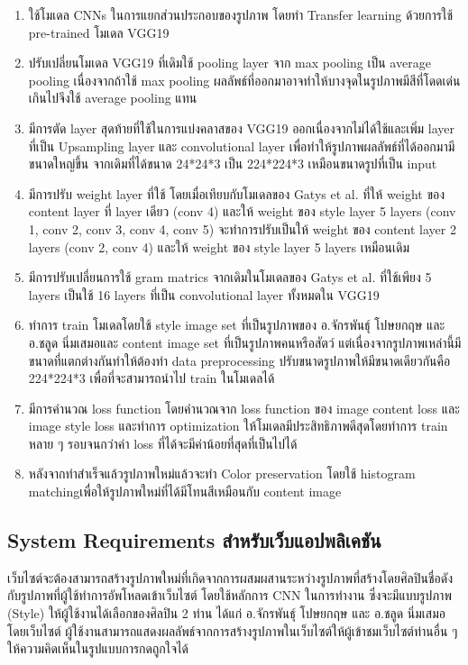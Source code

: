 \documentclass[12pt,oneside,openright,a4paper]{cpe-thai-project}
\begin{document}
\begin{enumerate}
  \item ใช้โมเดล CNNs ในการแยกส่วนประกอบของรูปภาพ โดยทำ Transfer learning ด้วยการใช้ pre-trained โมเดล VGG19 
  \item ปรับเปลี่ยนโมเดล VGG19 ที่เดิมใช้ pooling layer จาก max pooling เป็น average pooling เนื่องจากถ้าใช้ max pooling ผลลัพธ์ที่ออกมาอาจทำให้บางจุดในรูปภาพมีสีที่โดดเด่นเกินไปจึงใช้  average pooling แทน
  \item มีการตัด layer สุดท้ายที่ใช้ในการแบ่งคลาสของ VGG19 ออกเนื่องจากไม่ได้ใช้และเพิ่ม layer ที่เป็น Upsampling layer และ convolutional layer เพื่อทำให้รูปภาพผลลัพธ์ที่ได้ออกมามีขนาดใหญ่ขึ้น จากเดิมที่ได้ขนาด 24*24*3 เป็น 224*224*3 เหมือนขนาดรูปที่เป็น input
  \item มีการปรับ weight layer ที่ใช้ โดยเมื่อเทียบกับโมเดลของ Gatys  et al. \cite{gatys2015neural} ที่ให้ weight ของ content layer ที่ layer เดียว (conv 4) และให้ weight ของ style layer 5 layers (conv 1, conv 2, conv 3, conv 4, conv 5) จะทำการปรับเป็นให้ weight ของ content layer 2 layers (conv 2, conv 4) และให้ weight ของ style layer 5 layers เหมือนเดิม 
  \item มีการปรับเปลี่ยนการใช้ gram matrics จากเดิมในโมเดลของ Gatys  et al. \cite{gatys2015neural} ที่ใช้เพียง 5 layers เป็นใช้ 16 layers ที่เป็น convolutional layer ทั้งหมดใน VGG19
  \item ทำการ train โมเดลโดยใช้ style image set ที่เป็นรูปภาพของ อ.จักรพันธุ์ โปษยกฤษ และ อ.ชลูด นิ่มเสมอและ content image set ที่เป็นรูปภาพคนหรือสัตว์ แต่เนื่องจากรูปภาพเหล่านี้มีขนาดที่แตกต่างกันทำให้ต้องทำ data preprocessing ปรับขนาดรูปภาพให้มีขนาดเดียวกันคือ 224*224*3 เพื่อที่จะสามารถนำไป train ในโมเดลได้
  \item มีการคำนวณ loss function โดยคำนวณจาก loss function ของ image content loss และ image style loss และทำการ optimization ให้โมเดลมีประสิทธิภาพดีสุดโดยทำการ train หลาย ๆ รอบจนกว่าค่า loss ที่ได้จะมีค่าน้อยที่สุดที่เป็นไปได้
  \item หลังจากทำสำเร็จแล้วรูปภาพใหม่แล้วจะทำ Color preservation โดยใช้ histogram matchingเพื่อให้รูปภาพใหม่ที่ได้มีโทนสีเหมือนกับ content image
\end{enumerate}


\subsection{System Requirements สำหรับเว็บแอปพลิเคชัน}
\par\setlength{\parindent}{5ex}
เว็บไซต์จะต้องสามารถสร้างรูปภาพใหม่ที่เกิดจากการผสมผสานระหว่างรูปภาพที่สร้างโดยศิลปินชื่อดังกับรูปภาพที่ผู้ใช้ทำการอัพโหลดเข้าเว็บไซต์ โดยใช้หลักการ CNN ในการทำงาน ซึ่งจะมีแบบรูปภาพ (Style) ให้ผู้ใช้งานได้เลือกของศิลปิน 2 ท่าน ได้แก่ อ.จักรพันธุ์ โปษยกฤษ และ อ.ชลูด นิ่มเสมอ โดยเว็บไซต์ ผู้ใช้งานสามารถแสดงผลลัพธ์จากการสร้างรูปภาพในเว็บไซต์ให้ผู้เข้าชมเว็บไซต์ท่านอื่น ๆให้ความคิดเห็นในรูปแบบการกดถูกใจได้ 
\end{document}
